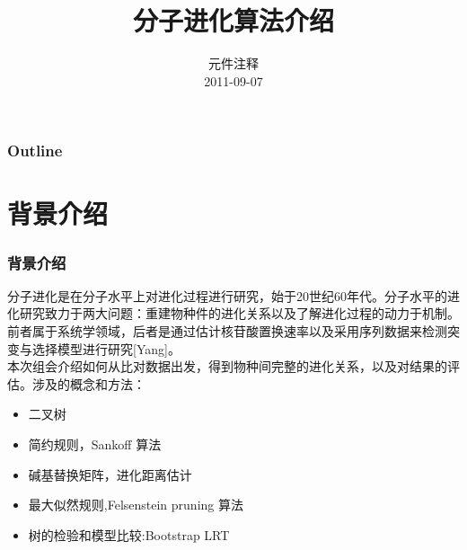 \documentclass{beamer}
\begin{document}
{
\begin{frame}
    \title{分子进化算法介绍}
    \author{元件注释\\2011-09-07 }
    \maketitle
\end{frame}
}
\begin{frame}\frametitle{Outline}                       %
\tableofcontents
\end{frame}
\section{背景介绍}
\begin{frame}\frametitle{背景介绍}
分子进化是在分子水平上对进化过程进行研究，始于20世纪60年代。分子水平的进化研究致力于两大问题：重建物种件的进化关系以及了解进化过程的动力于机制。前者属于系统学领域，后者是通过估计核苷酸置换速率以及采用序列数据来检测突变与选择模型进行研究[Yang]。\\
本次组会介绍如何从比对数据出发，得到物种间完整的进化关系，以及对结果的评估。涉及的概念和方法：
\begin{itemize}
\item 二叉树
\item 简约规则，Sankoff 算法
\item 碱基替换矩阵，进化距离估计
\item 最大似然规则,Felsenstein pruning 算法
\item 树的检验和模型比较:Bootstrap  LRT
\end{itemize}
\end{frame}
\end{document}
